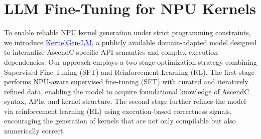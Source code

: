 \section{LLM Fine-Tuning for NPU Kernels}\label{fine_tune}


To enable reliable NPU kernel generation under strict programming constraints, we introduce \href{https://huggingface.co/AscendKernelGen/models}{\textcolor{blue}{KernelGen-LM}}, a publicly available domain-adapted model designed to internalize AscendC-specific API semantics and complex execution dependencies. Our approach employs a two-stage optimization strategy combining Supervised Fine-Tuning (SFT) and Reinforcement Learning (RL). The first stage performs NPU-aware supervised fine-tuning (SFT) with curated and iteratively refined data, enabling the model to acquire foundational knowledge of AscendC syntax, APIs, and kernel structure. The second stage further refines the model via reinforcement learning (RL) using execution-based correctness signals, encouraging the generation of kernels that are not only compilable but also numerically correct.

